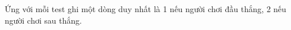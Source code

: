 Ứng với mỗi test ghi một dòng duy nhất là 1 nếu người chơi đầu thắng, 2 nếu người chơi sau thắng.  

\